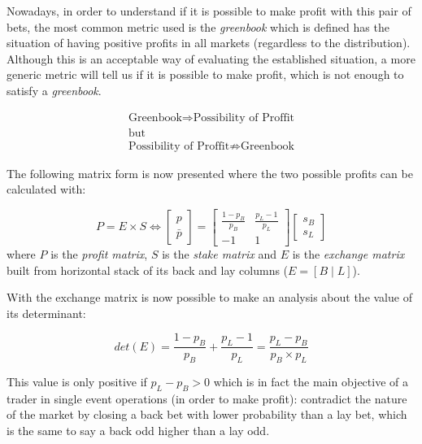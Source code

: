 \documentclass{article}
\begin{document}
Nowadays, in order to understand if it is possible to make profit 
with this pair of bets, the most common metric used is the 
\emph{greenbook} which is defined has the situation of having 
positive profits in all markets (regardless to the distribution). 
Although this is an acceptable way of evaluating the established 
situation, a more generic metric will tell us if it is possible to 
make profit, which is not enough to satisfy a \emph{greenbook}.

\[
\begin{array}{c}
    \text{Greenbook} \Rightarrow \text{Possibility of Proffit}\\
    \text{but}\\
    \text{Possibility of Proffit} \not \Rightarrow \text{Greenbook}
\end{array}
\]

The following matrix form is now presented where the two possible 
profits can be calculated with:

\begin{equation}
\label{eq:pesSystem}
P = E \times S \Leftrightarrow
\begin{bmatrix}
p\\
\bar{p}
\end{bmatrix} =
\begin{bmatrix}
    \frac{1-p_{B}}{p_{B}} & \frac{p_{L}-1}{p_{L}}\\
    -1 & 1
\end{bmatrix}
\begin{bmatrix}
    s_{B}\\
    s_{L}
\end{bmatrix}
\end{equation}
where $P$ is the \emph{profit matrix}, $S$ is the \emph{stake matrix} 
and $E$ is the \emph{exchange matrix} built from horizontal 
stack of its back and lay columns ($E = \left[ B \mid L \right]$).

With the exchange matrix is now possible to make an analysis about 
the value of its determinant:

\[
det(E) = \frac{1-p_{B}}{p_{B}} + \frac{p_{L}-1}{p_{L}} =
                                 \frac{p_{L}-p_{B}}{p_{B} \times p_{L}}
\]

This value is only positive if $p_{L}-p_{B}>0$ which is in fact the 
main objective of a trader in single event operations (in order to 
make profit): contradict the nature of the market by closing a back 
bet with lower probability than a lay bet, which is the same to say 
a back odd higher than a lay odd.
\end{document}
